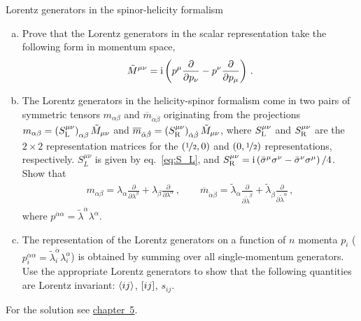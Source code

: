 \begin{exer}{Lorentz generators in the spinor-helicity formalism}
\label{Ex:1.5}
\vspace{-0.6cm}
\begin{enumerate}[a)]
\item Prove that the Lorentz generators in the scalar representation take the following form in momentum space, 
\begin{align}
\tilde{M}^{\mu\nu} = \mathrm{i} \left( p^{\mu} \frac{\partial}{\partial p_{\nu}} - p^{\nu} \frac{\partial}{\partial p_{\mu}} \right) \,.
\end{align}

\smallskip
\item The Lorentz generators in the helicity-spinor formalism come in two pairs of symmetric tensors $m_{\alpha \beta}$ and $\overline{m}_{\dot\alpha \dot\beta}$ originating from the projections $m_{\alpha \beta}=\left(S^{\mu\nu}_{\rm L}\right)_{\alpha \beta} \tilde{M}_{\mu\nu}$ and  $\overline{m}_{\dot\alpha \dot\beta}=\left(S^{\mu \nu}_{\rm R}\right)_{\dot\alpha \dot\beta} \tilde{M}_{\mu \nu}$, where $S^{\mu\nu}_{\rm L}$ and $S^{\mu\nu}_{\rm R}$ are the $2 \times 2$ representation matrices for the $(\nicefrac{1}{2},0)$ and $(0,\nicefrac{1}{2})$ representations, respectively. $S^{\mu\nu}_L$ is given by eq.~\eqref{eq:S_L}, and $S^{\mu \nu}_{\rm R} = \mathrm{i}\left(\bar{\sigma}^{\mu} \sigma^{\nu}-\bar{\sigma}^{\nu} \sigma^{\mu} \right)/4 $.
Show that
\begin{align}
m_{\alpha \beta} = \lambda_{\alpha} \frac{\partial}{\partial \lambda^{\beta}}+ \lambda_{\beta} \frac{\partial}{\partial \lambda^{\alpha}} \,, \qquad \overline{m}_{\dot\alpha \dot\beta} = \tilde{\lambda}_{\dot\alpha} \frac{\partial}{\partial \tilde{\lambda}^{\dot\beta}}+ \tilde{\lambda}_{\dot\beta} \frac{\partial}{\partial \tilde{\lambda}^{\dot{\alpha}}} \,,
\end{align}
where $p^{\dot\alpha\alpha} = \tilde{\lambda}^{\dot\alpha} \lambda^{\alpha}$.

\smallskip
\item The representation of the Lorentz generators on a function of $n$ momenta $p_i$ ($p_i^{\dot\alpha\alpha} = \tilde{\lambda}_i^{\dot\alpha} \lambda_i^{\alpha}$) is obtained by summing over all  single-momentum generators. Use the appropriate Lorentz generators to show that the following quantities are Lorentz invariant: $\langle ij\rangle$, $[ij]$, $s_{ij}$.

\end{enumerate}
For the solution see \hyperref[Sol:1.5]{chapter~5}.
\end{exer}



